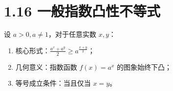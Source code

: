 \documentclass{article}
\begin{document}
\section*{1.16 一般指数凸性不等式}
设 \( a>0, a\neq 1 \)，对于任意实数 \( x,y \)：
\begin{enumerate}
    \item 核心形式：\( \frac{a^x+a^y}{2} \geq a^{\frac{x+y}{2}} \)；
    \item 几何意义：指数函数 \( f(x)=a^x \) 的图象始终下凸；
    \item 等号成立条件：当且仅当 \( x=y \)。
\end{enumerate}
\end{document}
